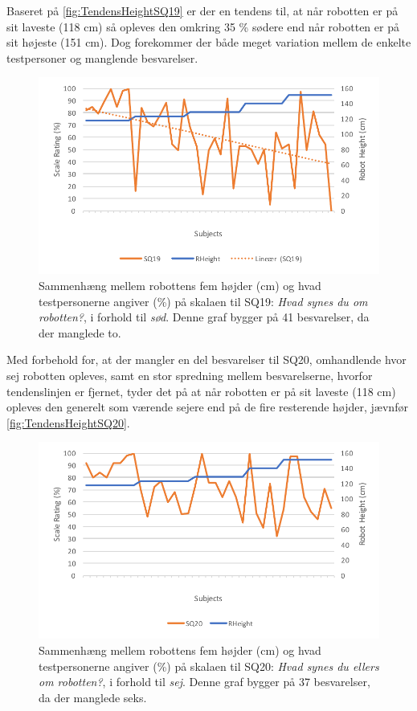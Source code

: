 \noindent
%
Baseret på \autoref{fig:TendensHeightSQ19} er der en tendens til, at når robotten er på sit laveste (118 cm) så opleves den omkring 35 \% sødere end når robotten er på sit højeste (151 cm). Dog forekommer der både meget variation mellem de enkelte testpersoner og manglende besvarelser. 
%
\begin{figure}[H]
\centering
\includegraphics[width=\textwidth]{Figure/DatabehandlingSkalaer/TendensHeight/HeightSQ19}
\caption{Sammenhæng mellem robottens fem højder (cm) og hvad testpersonerne angiver (\%) på skalaen til SQ19: \textit{Hvad synes du om robotten?}, i forhold til \textit{sød}. Denne graf bygger på 41 besvarelser, da der manglede to.}
\label{fig:TendensHeightSQ19}
\end{figure}
\noindent
%
Med forbehold for, at der mangler en del besvarelser til SQ20, omhandlende hvor sej robotten opleves, samt en stor spredning mellem besvarelserne, hvorfor tendenslinjen er fjernet, tyder det på at når robotten er på sit laveste (118 cm) opleves den generelt som værende sejere end på de fire resterende højder, jævnfør \autoref{fig:TendensHeightSQ20}.
%
\begin{figure}[H]
\centering
\includegraphics[width=\textwidth]{Figure/DatabehandlingSkalaer/TendensHeight/HeightSQ20}
\caption{Sammenhæng mellem robottens fem højder (cm) og hvad testpersonerne angiver (\%) på skalaen til SQ20: \textit{Hvad synes du ellers om robotten?}, i forhold til \textit{sej}. Denne graf bygger på 37 besvarelser, da der manglede seks.}
\label{fig:TendensHeightSQ20}
\end{figure}
\noindent
%
